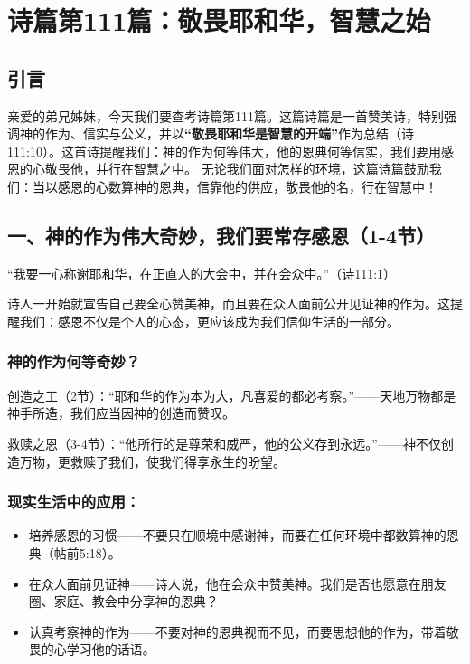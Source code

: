 \documentclass[a4paper, 12pt]{article}
\begin{document}
\section{诗篇第111篇：敬畏耶和华，智慧之始}
\subsection*{引言}
亲爱的弟兄姊妹，今天我们要查考诗篇第111篇。这篇诗篇是一首赞美诗，特别强调神的作为、信实与公义，并以\textbf{“敬畏耶和华是智慧的开端”}作为总结（诗111:10）。这首诗提醒我们：神的作为何等伟大，他的恩典何等信实，我们要用感恩的心敬畏他，并行在智慧之中。
无论我们面对怎样的环境，这篇诗篇鼓励我们：当以感恩的心数算神的恩典，信靠他的供应，敬畏他的名，行在智慧中！

\subsection*{一、神的作为伟大奇妙，我们要常存感恩（1-4节）}
“我要一心称谢耶和华，在正直人的大会中，并在会众中。”（诗111:1）

诗人一开始就宣告自己要全心赞美神，而且要在众人面前公开见证神的作为。这提醒我们：感恩不仅是个人的心态，更应该成为我们信仰生活的一部分。

\subsubsection*{神的作为何等奇妙？}

\hspace{0.6cm}创造之工（2节）：“耶和华的作为本为大，凡喜爱的都必考察。”——天地万物都是神手所造，我们应当因神的创造而赞叹。

救赎之恩（3-4节）：“他所行的是尊荣和威严，他的公义存到永远。”——神不仅创造万物，更救赎了我们，使我们得享永生的盼望。
\subsubsection*{现实生活中的应用：}
\begin{itemize}
    \item 培养感恩的习惯——不要只在顺境中感谢神，而要在任何环境中都数算神的恩典（帖前5:18）。

    \item 在众人面前见证神——诗人说，他在会众中赞美神。我们是否也愿意在朋友圈、家庭、教会中分享神的恩典？

    \item 认真考察神的作为——不要对神的恩典视而不见，而要思想他的作为，带着敬畏的心学习他的话语。

\end{itemize}
\end{document}

